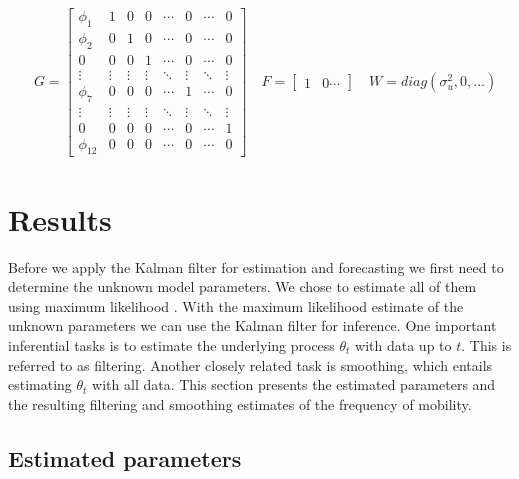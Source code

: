 \documentclass[12pt, a4paper]{article}
\begin{document}
\begin{align*}
& G = \begin{bmatrix} 
\phi_{1}  & 1      & 0      & 0      & \cdots & 0      & \cdots & 0      \\
\phi_{2}  & 0      & 1      & 0      & \cdots & 0      & \cdots & 0      \\
0         & 0      & 0      & 1      & \cdots & 0      & \cdots & 0      \\
\vdots    & \vdots & \vdots & \vdots & \ddots & \vdots & \ddots & \vdots \\
\phi_{7}  & 0      & 0      & 0      & \cdots & 1      & \cdots & 0      \\
\vdots    & \vdots & \vdots & \vdots & \ddots & \vdots & \ddots & \vdots \\
0         & 0      & 0      & 0      & \cdots & 0      & \cdots & 1      \\
\phi_{12} & 0      & 0      & 0      & \cdots & 0      & \cdots & 0
\end{bmatrix} \quad F = \begin{bmatrix} 1 & 0 \cdots \end{bmatrix} \quad W = diag(\sigma_{u}^{2}, 0, ...)
\end{align*}


\section{Results}\label{results}

Before we apply the Kalman filter for estimation and forecasting we first need to determine the
unknown model parameters. We chose to estimate all of them using maximum
likelihood \citep[see][ch.~4]{petris2009dynamic}. With the maximum likelihood estimate of the unknown parameters we can use the Kalman filter for inference. One important inferential tasks is to estimate the underlying process $\theta_{t}$ with data up to $t$. This is referred to as filtering. Another closely related task is smoothing, which entails estimating $\theta_{t}$ with all data. This section presents the estimated parameters and the resulting filtering and smoothing estimates of the frequency of mobility.

\subsection{Estimated parameters}\label{estimated-parameters}
\end{document}
